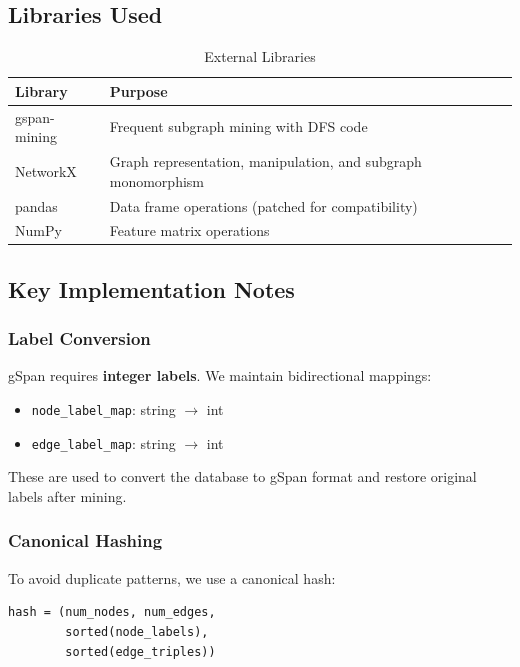 \documentclass[12pt,a4paper]{article}
\begin{document}
\subsection{Libraries Used}

\begin{table}[H]
\centering
\begin{tabular}{ll}
\toprule
\textbf{Library} & \textbf{Purpose} \\
\midrule
gspan-mining & Frequent subgraph mining with DFS code \\
NetworkX & Graph representation, manipulation, and subgraph monomorphism \\
pandas & Data frame operations (patched for compatibility) \\
NumPy & Feature matrix operations \\
\bottomrule
\end{tabular}
\caption{External Libraries}
\end{table}

\subsection{Key Implementation Notes}

\subsubsection{Label Conversion}

gSpan requires \textbf{integer labels}. We maintain bidirectional mappings:
\begin{itemize}
    \item \texttt{node\_label\_map}: string $\rightarrow$ int
    \item \texttt{edge\_label\_map}: string $\rightarrow$ int
\end{itemize}

These are used to convert the database to gSpan format and restore original labels after mining.

\subsubsection{Canonical Hashing}

To avoid duplicate patterns, we use a canonical hash:

\begin{verbatim}
hash = (num_nodes, num_edges, 
        sorted(node_labels), 
        sorted(edge_triples))
\end{verbatim}
\end{document}
